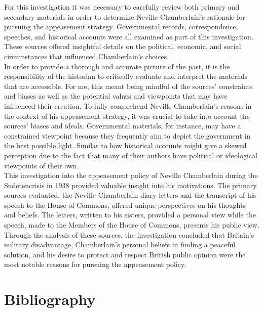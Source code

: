 \documentclass[10pt, a4papert, hidelinks]{article}
\begin{document}
For this investigation it was necessary to carefully review both primary and secondary materials in order to determine Neville Chamberlain's rationale for pursuing the appeasement strategy. Governmental records, correspondence, speeches, and historical accounts were all examined as part of this investigation. These sources offered insightful details on the political, economic, and social circumstances that influenced Chamberlain's choices.\\
In order to provide a thorough and accurate picture of the past, it is the responsibility of the historian to critically evaluate and interpret the materials that are accessible. For me, this meant being mindful of the sources' constraints and biases as well as the potential values and viewpoints that may have influenced their creation. To fully comprehend Neville Chamberlain's reasons in the context of his appeasement strategy, it was crucial to take into account the sources' biases and ideals. Governmental materials, for instance, may have a constrained viewpoint because they frequently aim to depict the government in the best possible light. Similar to how historical accounts might give a skewed perception due to the fact that many of their authors have political or ideological viewpoints of their own.\\
This investigation into the appeasement policy of Neville Chamberlain during the Sudetencrisis in 1938 provided valuable insight into his motivations. The primary sources evaluated, the Neville Chamberlain diary letters and the transcript of his speech to the House of Commons, offered unique perspectives on his thoughts and beliefs. The letters, written to his sisters, provided a personal view while the speech, made to the Members of the House of Commons, presents his public view. Through the analysis of these sources, the investigation concluded that Britain's military disadvantage, Chamberlain's personal beliefs in finding a peaceful solution, and his desire to protect and respect British public opinion were the most notable reasons for pursuing the appeasement policy.

\newpage
\section{Bibliography}
\printbibliography[heading=none]
\end{document}
